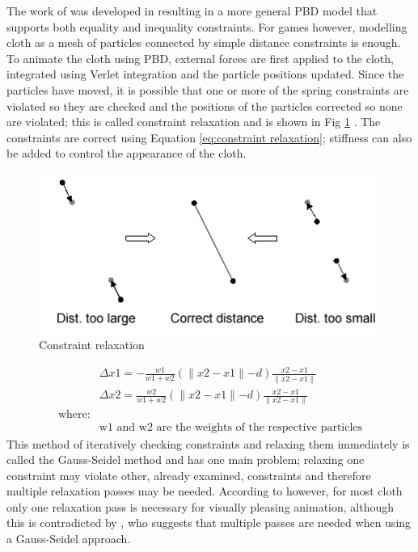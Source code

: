 The work of \textcite{Jakobsen2005} was developed in \textcite{Muller2006} resulting in a more general PBD model that supports both equality and inequality constraints. For games however, modelling cloth as a mesh of particles connected by simple distance constraints is enough.
\\To animate the cloth using PBD, external forces are first applied to the cloth, integrated using Verlet integration and the particle positions updated. Since the particles have moved, it is possible that one or more of the spring constraints are violated so they are checked and the positions of the particles corrected so none are violated; this is called constraint relaxation and is shown in Fig \ref{fig:constraint relaxation} . The constraints are correct using Equation \ref{eq:constraint relaxation}\parencite[4]{Muller2006}; stiffness can also be added to control the appearance of the cloth.
\begin{figure}[tp]
   \begin{center}
     \includegraphics{Figures/pbd}
   \end{center}
   \caption[Constraint relaxation]{Constraint relaxation \parencite[1]{Jakobsen2005}}
   \label{fig:constraint relaxation}
\end{figure}
\begin{equation}
\begin{split}
\label{eq:constraint relaxation}
  &\Delta x1 = - \frac{w1}{w1 + w2}(\parallel x2 - x1 \parallel - d)\frac{x2 - x1}{\parallel x2 - x1 \parallel}
  \\&\Delta x2 = \frac{w2}{w1 + w2}(\parallel x2 - x1 \parallel - d)\frac{x2 - x1}{\parallel x2 - x1 \parallel}
  \\\text{where:}
  \\&\text{w1 and w2 are the weights of the respective particles}
\end{split}
\end{equation}
This method of iteratively checking constraints and relaxing them immediately is called the Gauss-Seidel method and has one main problem; relaxing one constraint may violate other, already examined, constraints and therefore multiple relaxation passes may be needed. According to \textcite[1]{Jakobsen2005} however, for most cloth only one relaxation pass is necessary for visually pleasing animation, although this is contradicted by \parencite{Kim2011}, who suggests that multiple passes are needed when using a Gauss-Seidel approach.
